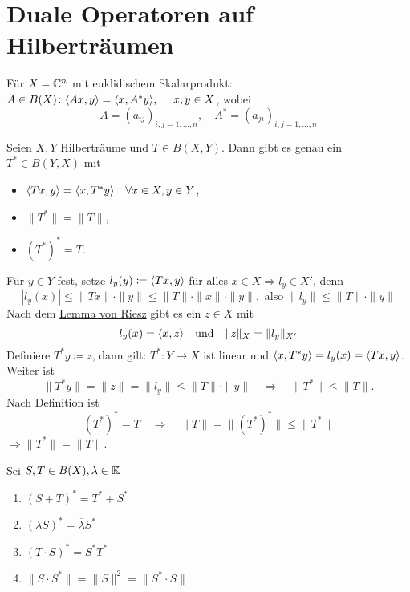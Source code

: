 


\section{Duale Operatoren auf Hilberträumen}



Für $X = \mathbb{C}^{n}$ mit euklidischem Skalarprodukt: \\
$A \in B(X) \colon \< A x , y \> = \< x , A^{*} y \>, \quad x, y \in X$, wobei
\[ A = (a_{ij})_{i, j = 1, \dotsc, n}, \quad A^{*} = (\overline{a_{ji}})_{i, j = 1, \dotsc, n} \]


\begin{satz}
	Seien $X, Y$ Hilberträume und $T \in B(X, Y)$. Dann gibt es genau ein $T^{*} \in B(Y, X)$ mit
	\begin{itemize}
		\item $\langle T x , y \rangle = \langle x , T^{*} y \rangle \quad \forall x \in X, y \in Y$,
		\item $\| T^{*} \| = \| T \|$,
		\item $\left(T	^{*}\right)^{*} = T$.
	\end{itemize}	
\end{satz}

\begin{beweis}
	Für $y \in Y$ fest, setze $l_{y}(y) \coloneqq \langle T x , y \rangle$ für alles $x \in X \Rightarrow l_{y} \in X'$, denn
	\[ | l_{y}(x) | \leq \| T x \| \cdot \| y \| \leq \|T \| \cdot \| x \| \cdot \| y \|, \text{ also } \| l_{y} \| \leq \| T \| \cdot \| y \| \]
	Nach dem \hyperref[lemma:6.3-Riesz]{Lemma von Riesz} gibt es ein $z \in X$ mit
	\[ l_{y} (x) = \langle x , z \rangle \quad \text{und} \quad \| z \|_{X} = \| l_{y} \|_{X'} \]
	Definiere $T^{*} y \coloneqq z$, dann gilt: $T^{*} \colon Y \rightarrow X$ ist linear und $\langle x , T^{*} y \rangle = l_{y}(x) = \langle T x , y \rangle$. \\
	Weiter ist 
	\[ \| T^{*} y \| = \| z \| = \| l_{y} \| \leq \| T \| \cdot \| y \| \quad \Rightarrow \quad \| T^{*} \| \leq \| T \|. \]
	Nach Definition ist 
	\[ \left( T^{*} \right)^{*} = T \quad \Rightarrow \quad \| T \| = \| \left( T^{*} \right)^{*} \| \leq \| T^{*} \| \]
	$\Rightarrow \| T^{*} \| = \| T \|$. 
\end{beweis}


\begin{bemerkung} \label{bem:19.2}
	Sei $S, T \in B(X), \lambda \in \mathbb{K}$
	\begin{enumerate}[label=\alph*\upshape)]
		\item $\left( S + T \right)^{*} = T^{*} + S^{*}$
		\item $\left( \lambda S \right)^{*} = \overline{\lambda} S^{*}$
		\item $\left( T \cdot S \right)^{*} = S^{*} T^{*}$
		\item $\| S \cdot S^{*} \| = \| S \|^{2} = \| S^{*} \cdot S \|$
	\end{enumerate}
\end{bemerkung}

